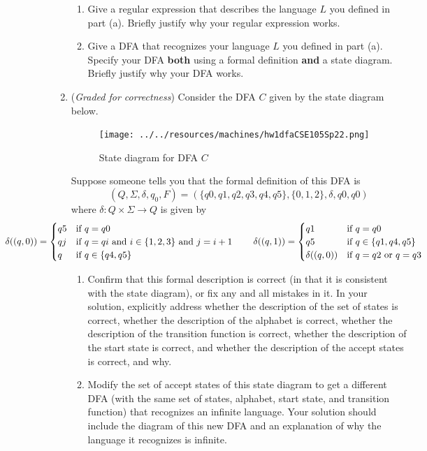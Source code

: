 \documentclass[12pt, oneside]{article}
\begin{document}
\begin{enumerate}
\begin{enumerate}
\item Give a regular expression that describes the language $L$ you defined in part (a).  
Briefly justify why your regular expression
works.
\item Give a DFA that recognizes your language $L$ you defined in part (a).  
Specify your DFA {\bf both} using a formal definition
{\bf and} a state diagram. Briefly justify why your DFA works.
\end{enumerate}

\item ({\it Graded for correctness}) Consider the DFA $C$ given by the state diagram below.
\begin{figure}[h]
   \centering
   \texttt{[image: ../../resources/machines/hw1dfaCSE105Sp22.png]}
   \caption{State diagram for DFA $C$}
\end{figure}

Suppose someone tells you that the formal definition of this DFA is 
\[
(Q, \Sigma, \delta, q_0, F) =  (\{ q0, q1, q2, q3, q4, q5 \}, \{0,1,2\}, \delta, q0, q0)
\]
where $\delta: Q \times \Sigma \to Q$ is given by 
\[
\hspace{-1in}\delta ( (q, 0) ) = \begin{cases}
q5 & \text{if $q=q0$} \\
qj & \text{if $q=qi$ and $i \in \{1,2,3\}$ and $j=i+1$} \\
q & \text{if $q \in \{q4,q5\}$} \\
\end{cases}  \qquad \delta ( (q, 1) ) = \begin{cases}
    q1 & \text{if $q=q0$} \\
    q5 & \text{if $q \in \{q1,q4,q5\}$} \\
    \delta( (q,0) ) & \text{if $q=q2$ or $q=q3$} \\
    \end{cases}
\]
\begin{enumerate}
\item Confirm that this formal description is correct (in that it is consistent with the 
state diagram), or fix any and all mistakes in it.
In your solution, explicitly address whether the description of the set of states is correct, whether the 
description of the alphabet is correct, 
whether the description of the transition function is correct, 
whether the description of the start state is correct, and whether 
the description of the accept states is correct, and why.

\item Modify the set of accept states of this state diagram to get a different DFA 
(with the same set of states, alphabet, start state, and transition function) 
that recognizes an infinite language. Your solution should include the 
diagram of this new DFA and an explanation of why the language it recognizes
is infinite.
\end{enumerate}



\end{enumerate}
\end{document}
